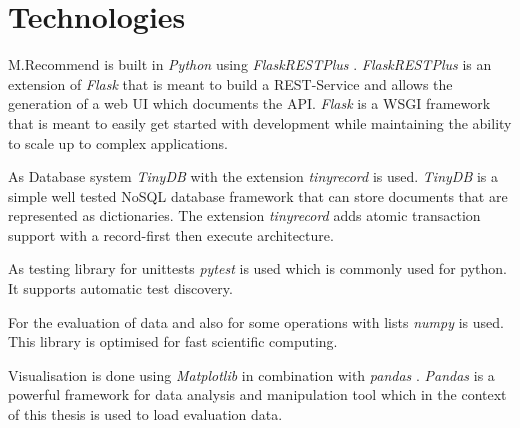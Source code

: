 \section{Technologies}
\label{sec:DesignImplementation:Technologies}

M.Recommend is built in \emph{Python} \cite{PythonOrg} using \emph{FlaskRESTPlus} \cite{FlaskRESTPlus13Documentation}. \emph{FlaskRESTPlus} is an extension of \emph{Flask} \cite{FlaskDocumentation} that is meant to build a REST-Service and allows the generation of a web UI which documents the API. \emph{Flask} is a WSGI \cite{WhatWSGI} framework that is meant to easily get started with development while maintaining the ability to scale up to complex applications.

As Database system \emph{TinyDB} \cite{TinyDB15Documentation} with the extension \emph{tinyrecord} \cite{junEugeneeeoTinyrecord2020} is used. \emph{TinyDB} is a simple well tested NoSQL database framework that can store documents that are represented as dictionaries. The extension \emph{tinyrecord} adds atomic transaction support with a record-first then execute architecture.

As testing library for unittests \emph{pytest} \cite{PytestDocumentation} is used which is commonly used for python. It supports automatic test discovery.

For the evaluation of data and also for some operations with lists \emph{numpy} \cite{NumPy} is used. This library is optimised for fast scientific computing. 

Visualisation is done using \emph{Matplotlib} \cite{MatplotlibDocumentation} in combination with \emph{pandas} \cite{PandasPythonData}. \emph{Pandas} is a powerful framework for data analysis and manipulation tool which in the context of this thesis is used to load evaluation data.